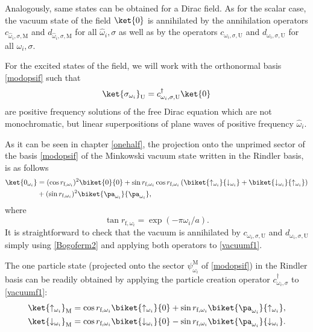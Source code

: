 Analogously, same states can be obtained for a Dirac field.  As for the scalar case, the vacuum state of the field
$\ket{0}$ is annihilated by the annihilation operators
$c_{\hat\omega_{i},\sigma,\text{M}}$ and $d_{\hat\omega_{i},\sigma,\text{M}}$ for all
$\hat\omega_i,\sigma$ as well as by the operators
$c_{\omega_i,\sigma,\text{U}}$ and $d_{\omega_i,\sigma,\text{U}}$ for all
$\omega_i,\sigma$.

For the excited states of the field, we will work with the orthonormal
basis \eqref{modopsif} such that
\begin{equation}\label{onepartgood}
\ket{\sigma_{\omega_i}}_\text{U}=c_{\omega_i,\sigma,\text{U}}^\dagger \ket{0}
\end{equation}
are positive frequency solutions of the free Dirac equation which are not
monochromatic, but linear superpositions of plane waves of positive
frequency $\hat\omega_i$.

As it can be seen in chapter \ref{onehalf}, the projection onto the unprimed sector of the basis \eqref{modopsif} of the Minkowski vacuum state written in the
Rindler basis, is as follows
\begin{align}\label{vacuumf1}
 \ket{0_{{\omega_i}}}&=(\cos r_{\text{f},\omega_i})^2\biket{0}{0}+
 \sin r_{\text{f},\omega_i} \cos r_{\text{f},\omega_i}
 \left(\biket{\uparrow_{{\omega_i}}}{\downarrow_{{\omega_i}}}
+ \biket{\downarrow_{{\omega_i}}}{\uparrow_{{\omega_i}}}\right)\nonumber\\
&+
(\sin r_{\text{f},\omega_i})^2\biket{\pa_{{\omega_i}}}{\pa_{{\omega_i}}},
\end{align}
where
\begin{equation}
\tan r_{\text{f},\omega_i}=\exp(-\pi\omega_i/a).
\end{equation}
It is straightforward to check that the vacuum is annihilated by
$c_{{\omega_i},\sigma,\text{U}}$ and $d_{{\omega_i},\sigma,\text{U}}$ simply using
\eqref{Bogoferm2} and applying both operators to \eqref{vacuumf1}.


The one particle state (projected onto the sector $\psi^\text{M}_{\omega_i}$ of \eqref{modopsif}) in the Rindler basis can be readily obtained by
applying the particle creation operator $c^\dagger_{{\omega_i},\sigma}$ to \eqref{vacuumf1}:
\begin{align}\label{onepartf1}
\ket{\uparrow_{{\omega_i}}}_\text{M}&=\cos r_{\text{f},\omega_i}
\biket{\uparrow_{{\omega_i}}}{0}+
\sin r_{\text{f},\omega_i}\biket{\pa_{{\omega_i}}}{\uparrow_{{\omega_i}}},\nonumber\\
\ket{\downarrow_{{\omega_i}}}_\text{M}&=\cos r_{\text{f},\omega_i}
\biket{\downarrow_{{\omega_i}}}{0}-
\sin r_{\text{f},\omega_i}\biket{\pa_{{\omega_i}}}{\downarrow_{{\omega_i}}}.
\end{align}


